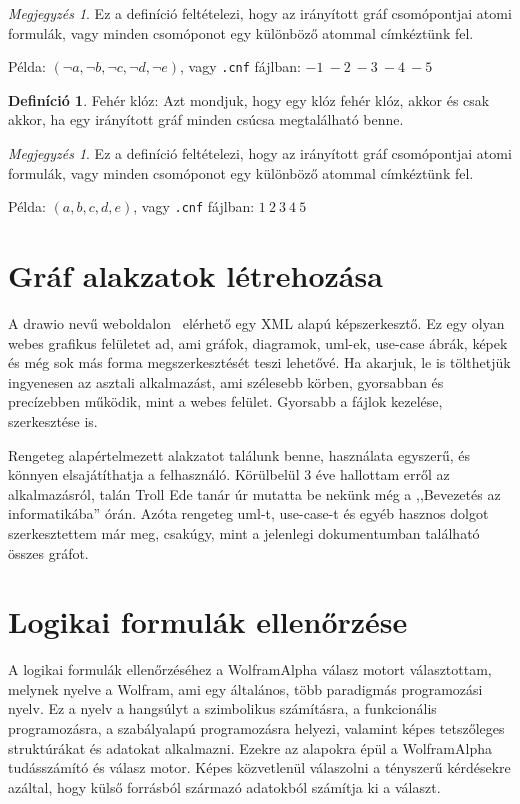 \documentclass[
]{thesis-ekf}
\theoremstyle{definition}
\newtheorem{definicio}[tetel]{Definíció}
\theoremstyle{remark}
\newtheorem{megjegyzes}[tetel]{Megjegyzés}
\begin{document}
\begin{megjegyzes}
	Ez a definíció feltételezi, hogy az irányított gráf csomópontjai atomi formulák, vagy minden csomóponot egy különböző atommal címkéztünk fel.
\end{megjegyzes}

	Példa: $(\neg a,\neg b,\neg c,\neg d,\neg e)$, vagy \texttt{.cnf} fájlban: $-1\ -2\ -3\ -4\ -5$

\begin{definicio}
	Fehér klóz: Azt mondjuk, hogy egy klóz fehér klóz, akkor és csak akkor, ha egy irányított gráf minden csúcsa megtalálható benne.
\end{definicio}

\begin{megjegyzes}
	Ez a definíció feltételezi, hogy az irányított gráf csomópontjai atomi formulák, vagy minden csomóponot egy különböző atommal címkéztünk fel.
\end{megjegyzes}

	Példa: $(a,b,c,d,e)$, vagy \texttt{.cnf} fájlban: $1\ 2\ 3\ 4\ 5$

	\section{Gráf alakzatok létrehozása}

	A drawio nevű weboldalon~\cite{link-drawio} elérhető egy \textsc{XML} alapú képszerkesztő. Ez egy olyan webes grafikus felületet ad, ami gráfok, diagramok, uml-ek, use-case ábrák, képek és még sok más forma megszerkesztését teszi lehetővé. Ha akarjuk, le is tölthetjük ingyenesen az asztali alkalmazást, ami szélesebb körben, gyorsabban és precízebben működik, mint a webes felület. Gyorsabb a fájlok kezelése, szerkesztése is.
	
	Rengeteg alapértelmezett alakzatot találunk benne, használata egyszerű, és könnyen elsajátíthatja a felhasználó. Körülbelül 3 éve hallottam erről az alkalmazásról, talán Troll Ede tanár úr mutatta be nekünk még a ,,Bevezetés az informatikába'' órán. Azóta rengeteg uml-t, use-case-t és egyéb hasznos dolgot szerkesztettem már meg, csakúgy, mint a jelenlegi dokumentumban található összes gráfot.
	
	\section{Logikai formulák ellenőrzése}
	
	A logikai formulák ellenőrzéséhez a WolframAlpha válasz motort választottam, melynek nyelve a Wolfram, ami egy általános, több paradigmás programozási nyelv. Ez a nyelv a hangsúlyt a szimbolikus számításra, a funkcionális programozásra, a szabályalapú programozásra helyezi, valamint képes tetszőleges struktúrákat és adatokat alkalmazni. Ezekre az alapokra épül a WolframAlpha tudásszámító és válasz motor. Képes közvetlenül válaszolni a tényszerű kérdésekre azáltal, hogy külső forrásból származó adatokból számítja ki a választ.
	
\end{document}
